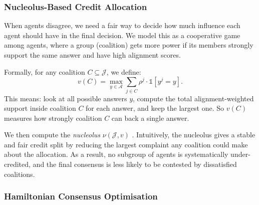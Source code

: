 \documentclass[12pt,a4paper]{article}
\newcommand{\calA}{\mathcal{A}}
\newcommand{\calJ}{\mathcal{J}}
\begin{document}



\subsubsection{Nucleolus-Based Credit Allocation}

When agents disagree, we need a fair way to decide how much influence each agent should
have in the final decision. We model this as a cooperative game among agents, where a
group (coalition) gets more power if its members strongly support the same answer and
have high alignment scores.

Formally, for any coalition $C \subseteq \calJ$, we define:
\begin{equation}
  v(C) = \max_{y \in \calA} \sum_{j \in C} \rho^j \cdot \mathbb{1}[y^j = y].
  \label{eq:credit_game}
\end{equation}
This means: look at all possible answers $y$, compute the total alignment-weighted support
inside coalition $C$ for each answer, and keep the largest one. So $v(C)$ measures how
strongly coalition $C$ can back a single answer.

We then compute the \emph{nucleolus} $\nu(\calJ, v)$ \citep{schmeidler1969nucleolus}.
Intuitively, the nucleolus gives a stable and fair credit split by reducing the largest
complaint any coalition could make about the allocation. As a result, no subgroup of
agents is systematically under-credited, and the final consensus is less likely to be
contested by dissatisfied coalitions.


\subsubsection{Hamiltonian Consensus Optimisation}
\end{document}
